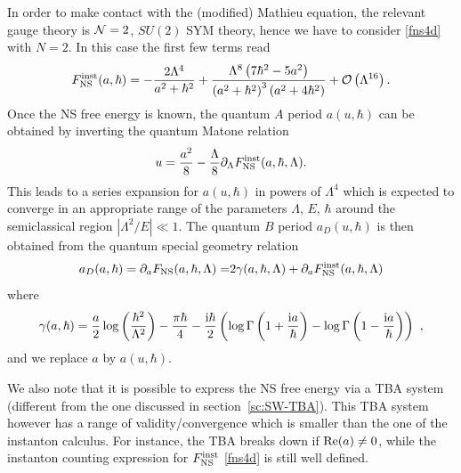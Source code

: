 \documentclass[a4paper,11pt]{article}
\theoremstyle{definition}
\newcommand{\CN}{{\cal N}}
\newcommand{\CO}{{\cal O}}
\newcommand{\ri}{{\rm i}}
\newcommand{\ba}{\begin{aligned}}
\newcommand{\ea}{\end{aligned}}
\begin{document}
In order to make contact with the (modified) Mathieu equation, the relevant
gauge theory is $\CN=2$, $SU(2)$ SYM theory, hence we
have to consider \eqref{fns4d} with $N=2$. In this case the first few
terms read
%
\begin{equation}
  \label{inst} \ba F_{\rm NS}^{\rm inst}(a, \hbar)=-\frac{2 \Lambda
    ^4}{a^2+\hbar ^2}+ \frac{\Lambda ^8 \left(7 \hbar ^2-5
      a^2\right)}{\left(a^2+\hbar ^2\right)^3 \left(a^2+4 \hbar
      ^2\right)}+\CO\left(\Lambda ^{16}\right).\ea
\end{equation}
%
Once the NS free energy is known, the quantum
$A$ period $a(u,\hbar)$ can be obtained by inverting the quantum
Matone relation \cite{acdkv,lmn,francisco,bk,bkk,fm-wilson,sciarappa1} 
%
\begin{equation}
  \label{mmap}u= {a^2\over 8}-{\Lambda \over 8}
  \partial_{\Lambda}F_{\rm NS}^{\rm inst}(a, \hbar, \Lambda).
\end{equation}
%
This leads to a series expansion for $a(u, \hbar)$ in powers of
$\Lambda^{4}$ which is expected to converge in an appropriate range of the parameters $\Lambda$, $E$, $\hbar$ around the semiclassical region $|\Lambda^2/E| \ll 1$.  The quantum
$B$ period $a_D(u,\hbar)$ is then obtained from the quantum special geometry relation
\begin{equation}
  \ba a_D(a, \hbar)=\partial_{a}F_{\rm NS}(a, \hbar, \Lambda)=& 2
  \gamma (a,\hbar,\Lambda )+\partial_{a}F_{\rm NS}^{\rm inst}(a,
  \hbar, \Lambda)\\ 
  \ea
\end{equation}
%
where \cite{hm}
%
\begin{equation}
  \label{gammadef}
  \gamma (a,\hbar )=\frac{a}{2}  \log \left({\hbar ^2\over
        \Lambda^2}\right)-\frac{\pi \hbar }{4}-\frac{\ri
  \hbar }{2}  \left(\log \Gamma\left(1+\frac{\ri a}{\hbar }\right)-\log
    \Gamma\left(1-\frac{\ri a}{\hbar }\right)\right) \ ,
\end{equation}
%
and we replace $a$ by $a(u,\hbar)$.


We also note that it is possible to express the NS free energy via a
TBA system \cite{ns,kt2} (different from the one discussed in
section~\ref{sc:SW-TBA}). This TBA system however has a range of
validity/convergence which is smaller than the one of the instanton
calculus. For instance, the TBA breaks down if ${\rm Re}(a)\neq 0$,
while the instanton counting expression for $F_{\rm NS}^{\rm inst}$
\eqref{fns4d} is still well defined.
\end{document}
